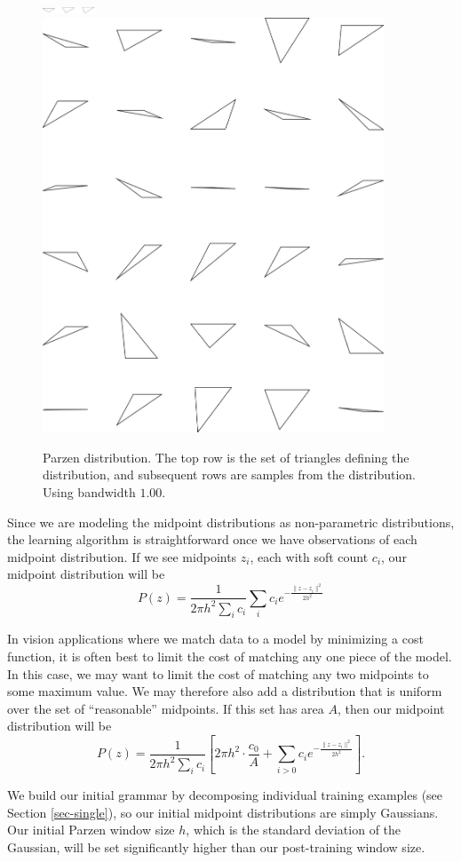 \begin{figure}
\includegraphics[width=0.6in]{output/1.models/test_parzen/parzen_true.png}\\ 
\includegraphics[width=4in]{output/1.models/test_parzen/parzen_1.00_samples.png}\\ 
\caption{Parzen distribution. The top row is the set of triangles
  defining the distribution, and subsequent rows are samples from the
  distribution. Using bandwidth $1.00$. }
\label{fig-parzen-5}
\end{figure}


Since we are modeling the midpoint distributions as non-parametric
distributions, the learning algorithm is straightforward once we have
observations of each midpoint distribution. If we see midpoints $z_i$,
each with soft count $c_i$, our midpoint distribution will be
$$P(z) = \frac{1}{2\pi h^2\sum_i c_i} \sum_i c_i e^{-\frac{\| z - z_i\|^2}{2h^2}}$$

In vision applications where we match data to a model by minimizing a
cost function, it is often best to limit the cost of matching any one
piece of the model. In this case, we may want to limit the cost of
matching any two midpoints to some maximum value. We may therefore
also add a distribution that is uniform over the set of ``reasonable''
midpoints. If this set has area $A$, then our midpoint distribution
will be
$$P(z) = \frac{1}{2\pi h^2\sum_i c_i} \left[2\pi h^2 \cdot \frac{c_0}{A} + \sum_{i>0} c_i
  e^{-\frac{\| z - z_i\|^2}{2h^2}}\right].$$

We build our initial grammar by decomposing individual training
examples (see Section \ref{sec-single}), so our initial midpoint
distributions are simply Gaussians. Our initial Parzen window size
$h$, which is the standard deviation of the Gaussian, will be set
significantly higher than our post-training window size.

